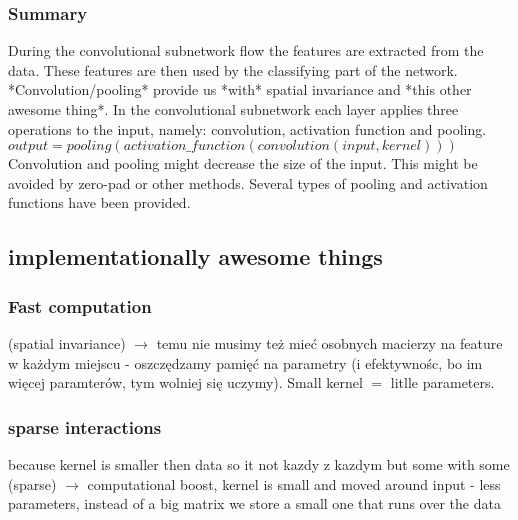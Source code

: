 \documentclass[a4paper,10pt]{report}
\begin{document}
	\subsubsection{Summary} %
	  During the convolutional subnetwork flow the features are extracted from the data. These features are then used by the classifying part of the network. *Convolution/pooling* provide us *with* spatial invariance and *this other awesome thing*. In the convolutional subnetwork each layer applies three operations to the input, namely: convolution, activation function and pooling. \\ %
	  
	  $output = pooling(activation\_function(convolution(input, kernel)))$\\ %
	  
	  Convolution and pooling might decrease the size of the input. This might be avoided by zero-pad or other methods. Several types of pooling and activation functions have been provided.\\ %
	  
      \subsection{implementationally awesome things} %
      
	\subsubsection{Fast computation}
	  (spatial invariance) $\rightarrow$ temu nie musimy też mieć osobnych macierzy na feature w każdym miejscu - oszczędzamy pamięć na parametry (i efektywnośc, bo im więcej paramterów, tym wolniej się uczymy). Small kernel $=$ litlle parameters.\\
	
	\subsubsection{sparse interactions} %
	  because kernel is smaller then data so it not kazdy z kazdym but some with some (sparse) $\rightarrow$ computational boost, kernel is small and moved around input - less parameters, instead of a big matrix we store a small one that runs over the data\\
	  
\end{document}
